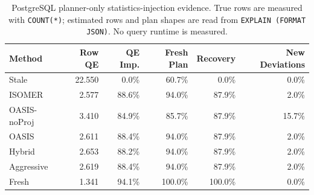 \begin{table}[t]
  \centering
  \small
  \caption{PostgreSQL planner-only statistics-injection evidence. True rows are measured with \texttt{COUNT(*)}; estimated rows and plan shapes are read from \texttt{EXPLAIN (FORMAT JSON)}. No query runtime is measured.}
  \label{tab:postgres_planner_stats_injection}
  \setlength{\tabcolsep}{4pt}
  \begin{tabular}{lrrrrr}
    \toprule
    Method & Row QE & QE Imp. & Fresh Plan & Recovery & New Deviations \\
    \midrule
    Stale & 22.550 & 0.0\% & 60.7\% & 0.0\% & 0.0\% \\
    ISOMER & 2.577 & 88.6\% & 94.0\% & 87.9\% & 2.0\% \\
    OASIS-noProj & 3.410 & 84.9\% & 85.7\% & 87.9\% & 15.7\% \\
    OASIS & 2.611 & 88.4\% & 94.0\% & 87.9\% & 2.0\% \\
    Hybrid & 2.653 & 88.2\% & 94.0\% & 87.9\% & 2.0\% \\
    Aggressive & 2.619 & 88.4\% & 94.0\% & 87.9\% & 2.0\% \\
    Fresh & 1.341 & 94.1\% & 100.0\% & 100.0\% & 0.0\% \\
    \bottomrule
  \end{tabular}
\end{table}
